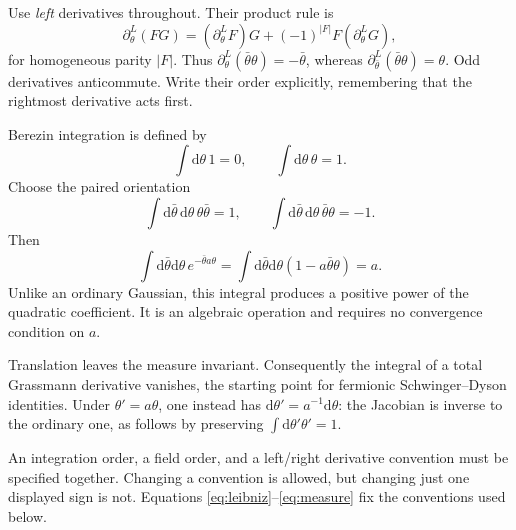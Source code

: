 \documentclass[11pt]{article}
\newcommand{\dd}{\mathrm d}
\begin{document}
Use \emph{left} derivatives throughout. Their product rule is
\begin{equation}
 \partial^L_\theta(FG)=(\partial^L_\theta F)G
 +(-1)^{|F|}F(\partial^L_\theta G),                   \label{eq:leibniz}
\end{equation}
for homogeneous parity \(|F|\). Thus
\(\partial^L_\theta(\bar\theta\theta)=-\bar\theta\),
whereas \(\partial^L_{\bar\theta}(\bar\theta\theta)=\theta\).
Odd derivatives anticommute. Write their order explicitly, remembering
that the rightmost derivative acts first.

Berezin integration is defined by
\begin{equation}
 \int\dd\theta\,1=0,\qquad \int\dd\theta\,\theta=1.
\end{equation}
Choose the paired orientation
\begin{equation}
 \int\dd\bar\theta\,\dd\theta\,\theta\bar\theta=1,
 \qquad
 \int\dd\bar\theta\,\dd\theta\,\bar\theta\theta=-1.
                                                        \label{eq:measure}
\end{equation}
Then
\begin{equation}
 \int\dd\bar\theta\dd\theta\,e^{-\bar\theta a\theta}
 =\int\dd\bar\theta\dd\theta(1-a\bar\theta\theta)=a.
                                                        \label{eq:onegauss}
\end{equation}
Unlike an ordinary Gaussian, this integral produces a positive power
of the quadratic coefficient. It is an algebraic operation and
requires no convergence condition on \(a\).

Translation leaves the measure invariant. Consequently the integral
of a total Grassmann derivative vanishes, the starting point for
fermionic Schwinger--Dyson identities. Under \(\theta'=a\theta\),
one instead has \(\dd\theta'=a^{-1}\dd\theta\): the Jacobian is
inverse to the ordinary one, as follows by preserving
\(\int\dd\theta'\theta'=1\).

\begin{keyidea}
An integration order, a field order, and a left/right derivative
convention must be specified together. Changing a convention is
allowed, but changing just one displayed sign is not. Equations
\eqref{eq:leibniz}--\eqref{eq:measure} fix the conventions used below.
\end{keyidea}
\end{document}

